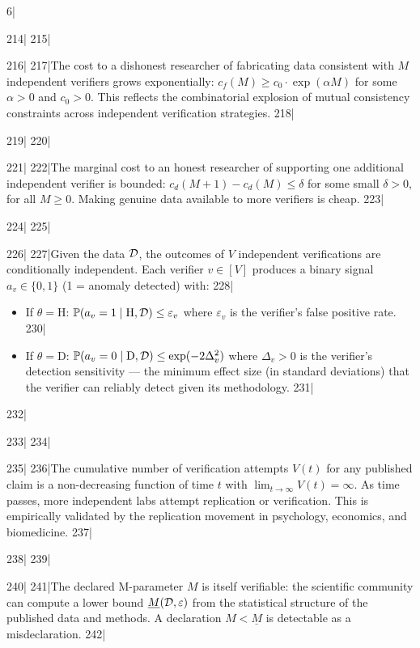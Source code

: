 6|\documentclass[12pt,a4paper]{article}
\begin{document}
214|
215|\begin{assumption}
216|\label{asm:cost_exp}
217|The cost to a dishonest researcher of fabricating data consistent with $M$ independent verifiers grows exponentially: $c_f(M) \ge c_0 \cdot \exp(\alpha M)$ for some $\alpha > 0$ and $c_0 > 0$. This reflects the combinatorial explosion of mutual consistency constraints across independent verification strategies.
218|\end{assumption}
219|
220|\begin{assumption}
221|\label{asm:cost_const}
222|The marginal cost to an honest researcher of supporting one additional independent verifier is bounded: $c_d(M+1) - c_d(M) \le \delta$ for some small $\delta > 0$, for all $M \ge 0$. Making genuine data available to more verifiers is cheap.
223|\end{assumption}
224|
225|\begin{assumption}
226|\label{asm:indep}
227|Given the data $\mathcal{D}$, the outcomes of $V$ independent verifications are conditionally independent. Each verifier $v \in [V]$ produces a binary signal $a_v \in \{0, 1\}$ (1 = anomaly detected) with:
228|\begin{itemize}[nosep]
229|    \item If $\theta = \text{H}$: $\mathbb{P}(a_v = 1 \mid \text{H}, \mathcal{D}) \le \varepsilon_v$ where $\varepsilon_v$ is the verifier's false positive rate.
230|    \item If $\theta = \text{D}$: $\mathbb{P}(a_v = 0 \mid \text{D}, \mathcal{D}) \le \exp(-2\Delta_v^2)$ where $\Delta_v > 0$ is the verifier's detection sensitivity — the minimum effect size (in standard deviations) that the verifier can reliably detect given its methodology.
231|\end{itemize}
232|\end{assumption}
233|
234|\begin{assumption}
235|\label{asm:growth}
236|The cumulative number of verification attempts $V(t)$ for any published claim is a non-decreasing function of time $t$ with $\lim_{t\to\infty} V(t) = \infty$. As time passes, more independent labs attempt replication or verification. This is empirically validated by the replication movement in psychology, economics, and biomedicine.
237|\end{assumption}
238|
239|\begin{assumption}
240|\label{asm:verifiable}
241|The declared M-parameter $M$ is itself verifiable: the scientific community can compute a lower bound $\underline{M}(\mathcal{D}, \varepsilon)$ from the statistical structure of the published data and methods. A declaration $M < \underline{M}$ is detectable as a misdeclaration.
242|\end{assumption}
\end{document}
